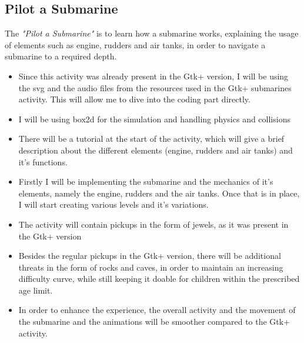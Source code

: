 \documentclass[preprint,12pt]{elsarticle}
\begin{document}
\subsection{Pilot a Submarine}

The  \textit{"Pilot a Submarine"} is to learn how a submarine works, explaining the usage of elements such as engine, rudders and air tanks, in order to navigate a submarine to a required depth.

\begin{itemize}


\item Since this activity was already present in the Gtk+ version, I will be using the svg and the audio files from the resources used in the Gtk+ submarines activity. This will allow me to dive into the coding part directly. 

\item I will be using box2d for the simulation and handling physics and collisions

\item There will be a tutorial at the start of the activity, which will give a brief description about the different elements (engine, rudders and air tanks) and it's functions.

\item Firstly I will be implementing the submarine and the mechanics of it's elements, namely the engine, rudders and the air tanks. Once that is in place, I will start creating various levels and it's variations.


\item The activity will contain pickups in the form of jewels, as it was present in the Gtk+ version

\item Besides the regular pickups in the Gtk+ version, there will be additional threats in the form of rocks and caves, in order to maintain an increasing difficulty curve, while still keeping it doable for children within the prescribed age limit.

\item In order to enhance the experience, the overall activity and the movement of the submarine and the animations will be smoother compared to the Gtk+ activity.


\end{itemize}
\end{document}

